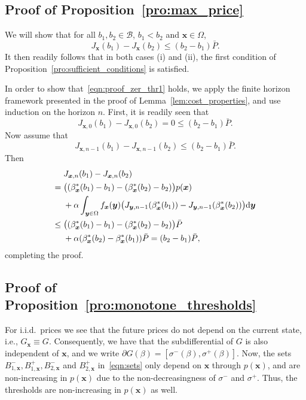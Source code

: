 \documentclass[journal]{IEEEtran}
\newcommand{\Bu}{\mathcal{B}}
\newcommand{\Pmax}{\bar{P}}
\newcommand{\bfx}{\boldsymbol x}
\newcommand{\bfy}{\boldsymbol y}
\newcommand\1{\mathbf{1}}
\begin{document}
\subsection{Proof of Proposition~\ref{pro:max_price}}\label{sec:proof_maxprice}

\begin{IEEEproof}
We will show that for all $b_1,b_2 \in \Bu$, $b_1 < b_2$ and $\bfx \in \Omega$,
\begin{equation}\label{eqn:proof_zer_thr1}
J_{\bfx}(b_1) - J_{\bfx}(b_2) \le (b_2 - b_1) \Pmax.
\end{equation}
It then readily follows that in both cases (i) and (ii), the first condition of Proposition~\ref{pro:sufficient_conditions} is satisfied.

In order to show that~\eqref{eqn:proof_zer_thr1} holds, we apply the finite horizon framework presented in the proof of Lemma~\ref{lem:cost_properties}, and use induction on the horizon $n$. First, it is readily seen that
\begin{equation*}
J_{\bfx,0}(b_1) - J_{\bfx,0}(b_2) = 0 \le (b_2 - b_1) \Pmax.
\end{equation*}
Now assume that
\begin{equation*}
J_{\bfx,n-1}(b_1) - J_{\bfx,n-1}(b_2) \le (b_2 - b_1) \Pmax.
\end{equation*}
Then
\begin{align*}
&J_{\bfx,n}(b_1) - J_{\bfx,n}(b_2)\\
={}& \big((\beta_{\bfx}^*(b_1) - b_1) - (\beta_{\bfx}^*(b_2) - b_2)\big) p(\bfx)\\
 &{}+ \alpha \int_{\bfy \in \Omega} f_{\bfx}(\bfy)\big( J_{\bfy,n-1}(\beta_{\bfx}^*(b_1)) - J_{\bfy,n-1}(\beta_{\bfx}^*(b_2)) \big){\rm d}\bfy\\
\le{}& \big((\beta_{\bfx}^*(b_1) - b_1) - (\beta_{\bfx}^*(b_2) - b_2)\big) \Pmax\\
 &{}+ \alpha(\beta_{\bfx}^*(b_2) - \beta_{\bfx}^*(b_1)) \Pmax  = (b_2 - b_1) \Pmax,
\end{align*}
completing the proof.
\end{IEEEproof}

\subsection{Proof of Proposition~\ref{pro:monotone_thresholds}}

\begin{IEEEproof}
For i.i.d.\ prices we see that the future prices do not depend on the current state, i.e., $G_{\bfx} \equiv G$. Consequently, we have that the subdifferential of $G$ is also independent of $\bfx$, and we write $\partial G(\beta) = [\sigma^-(\beta),\sigma^+(\beta)]$. Now, the sets $B_{1,\bfx}^-,B_{1,\bfx}^+,B_{2,\bfx}^-$ and $B_{2,\bfx}^+$ in~\eqref{eqn:sets} only depend on $\bfx$ through $p(\bfx)$, and are non-increasing in $p(\bfx)$ due to the non-decreasingness of $\sigma^-$ and $\sigma^+$. Thus, the thresholds are non-increasing in $p(\bfx)$ as well.
\end{IEEEproof}
\end{document}

